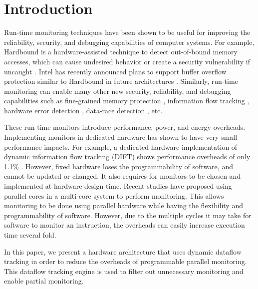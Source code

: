 \section{Introduction}
\label{sec:intro}

Run-time monitoring techniques have been shown to be useful for improving the
reliability, security, and debugging capabilities of computer systems. For
example, Hardbound is a hardware-assisted technique to detect out-of-bound
memory accesses, which can cause undesired behavior or create a security
vulnerability if uncaught \cite{hardbound-asplos08}.  Intel has
recently announced plans to support buffer overflow protection similar to
Hardbound in future architectures \cite{intel-mpx}. Similarly, run-time
monitoring can enable many other new security, reliability, and debugging
capabilities such as fine-grained memory protection \cite{mondrian-asplos02},
information flow tracking \cite{dift-asplos04, testudo-micro08}, hardware error
detection \cite{argus-micro07}, data-race detection \cite{radish-isca12,
cord-hpca06}, etc. 

These run-time monitors introduce performance, power, and energy overheads.
Implementing monitors in dedicated hardware has shown to have very small
performance impacts. For example, a dedicated hardware implementation of
dynamic information flow tracking (DIFT) shows performance
overheads of only 1.1\% \cite{dift-asplos04}. However, fixed hardware loses
the programmability of software, and cannot be updated or changed. It also
requires for monitors to be chosen and implemented at hardware design time.
Recent studies \cite{lba-isca08} have proposed using parallel cores in a
multi-core system to perform monitoring. This allows monitoring to be done
using parallel hardware while having the flexibility and programmability of
software. However, due to the multiple cycles it may take for software to
monitor an instruction, the overheads can easily increase execution time
several fold.

In this paper, we present a hardware architecture that uses dynamic dataflow
tracking in order to reduce the overheads of programmable parallel monitoring.
This dataflow tracking engine is used to filter out unnecessary monitoring and
enable partial monitoring.

